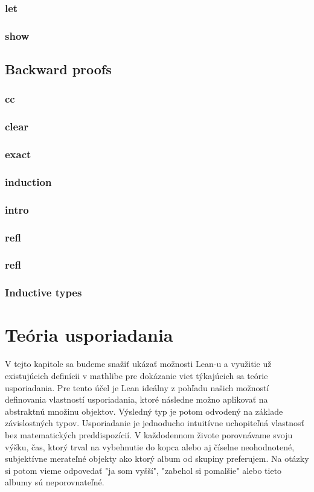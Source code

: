 \documentclass[a4paper,10pt,oneside]{report}%
\begin{document}
    \subsubsection{let}
    \subsubsection{show}
\subsection{Backward proofs}
    \subsubsection{cc}
    \subsubsection{clear}
    \subsubsection{exact}
    \subsubsection{induction}
    \subsubsection{intro}
    \subsubsection{refl}
    \subsubsection{refl}
\subsubsection{Inductive types}

\section{Teória usporiadania}
    V tejto kapitole sa budeme snažiť ukázať možnosti Lean-u a využitie už existujúcich
definícii v mathlibe pre dokázanie viet týkajúcich sa teórie usporiadania.
    Pre tento účel je Lean ideálny z pohľadu našich možností definovania vlastností
usporiadania, ktoré následne možno aplikovať na abstraktnú množinu objektov.
    Výsledný typ je potom odvodený na základe závislostných typov.
    Usporiadanie je jednoducho intuitívne uchopiteľná vlastnosť bez matematických
preddispozícií.
    V každodennom živote porovnávame svoju výšku, čas, ktorý trval na vybehnutie do kopca
alebo aj číselne neohodnotené, subjektívne merateľné objekty ako ktorý album
od skupiny preferujem.
    Na otázky si potom vieme odpovedať "ja som vyšší", "zabehol si pomalšie" alebo
tieto albumy sú neporovnateľné.
\end{document}
